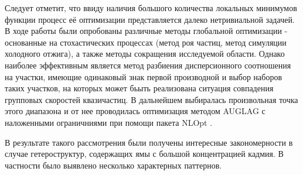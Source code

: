 \documentclass[../main.tex]{subfiles}
\begin{document}
        Следует отметит, что ввиду наличия большого количества локальных минимумов функции процесс её оптимизации представляется далеко нетривиальной задачей.
        В ходе работы были опробованы различные методы глобальной оптимизации - основанные на стохастических процессах (метод роя частиц, метод 
        симуляции холодного отжига), а также методы сокращения исследуемой области. Однако наиболее эффективным является метод разбиения 
        дисперсионного соотношения на участки, имеющие одинаковый знак первой производной и выбор наборов таких участков,
        на которых может бьыть реализована ситуация совпадения групповых скоростей квазичастиц. В дальнейшем выбиралась произвольная точка этого диапазона
        и от нее проводилась оптимизация методом AUGLAG \cite{AuglagOptim} с наложенными ограничниями при помощи пакета NLOpt \cite{NLopt}.

        В результате такого рассмотрения были получены интересные закономерности в случае гетероструктур, содержащих ямы с большой концентрацией кадмия.
        В частности было выявлено несколько характерных паттернов.
        
\end{document}
